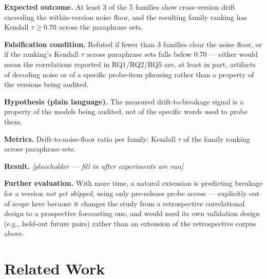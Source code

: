 \documentclass[11pt]{article}
\newcommand{\ph}{\textit{[placeholder --- fill in after experiments are run]}}
\begin{document}
\textbf{Expected outcome.} At least 3 of the 5 families show cross-version drift exceeding the within-version noise floor, and the resulting family ranking has Kendall $\tau \geq 0.70$ across the paraphrase sets.

\textbf{Falsification condition.} Refuted if fewer than 3 families clear the noise floor, or if the ranking's Kendall $\tau$ across paraphrase sets falls below 0.70 --- either would mean the correlations reported in RQ1/RQ2/RQ5 are, at least in part, artifacts of decoding noise or of a specific probe-item phrasing rather than a property of the versions being audited.

\textbf{Hypothesis (plain language).} The measured drift-to-breakage signal is a property of the models being audited, not of the specific words used to probe them.

\textbf{Metrics.} Drift-to-noise-floor ratio per family; Kendall $\tau$ of the family ranking across paraphrase sets.

\textbf{Result.} \ph

\vspace{0.5em}
\noindent\textbf{Further evaluation.} With more time, a natural extension is predicting breakage for a version \emph{not yet shipped}, using only pre-release probe access --- explicitly out of scope here because it changes the study from a retrospective correlational design to a prospective forecasting one, and would need its own validation design (e.g., held-out future pairs) rather than an extension of the retrospective corpus above.

\section{Related Work}
\end{document}
